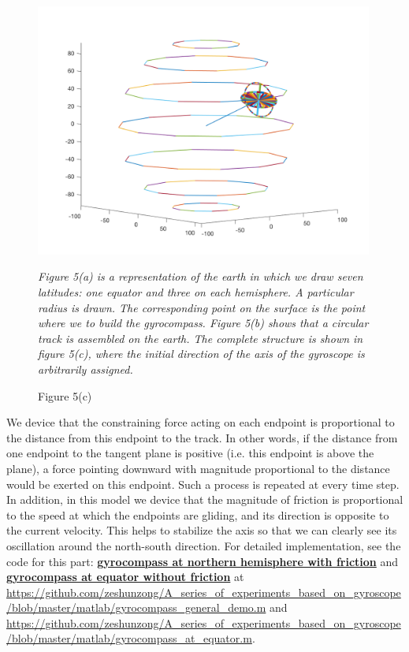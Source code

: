 \documentclass[12pt]{article}
\renewcommand{\(}{\left (}
\renewcommand{\)}{\right )}
\begin{document}
\begin{figure}[ht]
\begin{minipage}{0.33\textwidth}
		\includegraphics[width=0.99\textwidth]{gyro_structure.png}
		\caption*{\small Figure 5(c)}
	\end{minipage}

	\footnotesize
	\emph{Figure 5(a) is a representation of the earth in which we draw seven latitudes: one equator and three on each hemisphere. A particular radius is drawn. The corresponding point on the surface is the point where we to build the gyrocompass. Figure 5(b) shows that a circular track is assembled on the earth. The complete structure is shown in figure 5(c), where the initial direction of the axis of the gyroscope is arbitrarily assigned.}
\end{figure}

We device that the constraining force acting on each endpoint is proportional to the distance from this endpoint to the track. In other words, if the distance from one endpoint to the tangent plane is positive (i.e. this endpoint is above the plane), a force pointing downward with magnitude proportional to the distance would be exerted on this endpoint. Such a process is repeated at every time step. In addition, in this model we device that the magnitude of friction is proportional to the speed at which the endpoints are gliding, and its direction is opposite to the current velocity. This helps to stabilize the axis so that we can clearly see its oscillation around the north-south direction. For detailed implementation, see the code for this part: \href{https://github.com/zeshunzong/A_series_of_experiments_based_on_gyroscope/blob/master/matlab/gyrocompass_general_demo.m}{\textbf{gyrocompass at northern hemisphere with friction}} and \href{https://github.com/zeshunzong/A_series_of_experiments_based_on_gyroscope/blob/master/matlab/gyrocompass_at_equator.m}{\textbf{gyrocompass at equator without friction}} at \url{https://github.com/zeshunzong/A_series_of_experiments_based_on_gyroscope/blob/master/matlab/gyrocompass_general_demo.m} and \url{https://github.com/zeshunzong/A_series_of_experiments_based_on_gyroscope/blob/master/matlab/gyrocompass_at_equator.m}.
\end{document}

